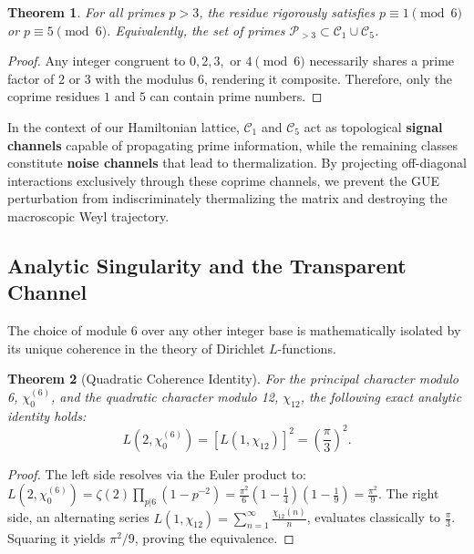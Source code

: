 \documentclass[prl,aps,floatfix,superscriptaddress,10pt]{revtex4-2}
\newtheorem{theorem}{Theorem}[section]
\begin{document}
\begin{theorem}
For all primes $p > 3$, the residue rigorously satisfies $p \equiv 1 \pmod 6$ or $p \equiv 5 \pmod 6$. Equivalently, the set of primes $\mathcal{P}_{>3} \subset \mathcal{C}_1 \cup \mathcal{C}_5$.
\end{theorem}

\begin{proof}
Any integer congruent to $0, 2, 3,$ or $4 \pmod 6$ necessarily shares a prime factor of $2$ or $3$ with the modulus $6$, rendering it composite. Therefore, only the coprime residues $1$ and $5$ can contain prime numbers.
\end{proof}

In the context of our Hamiltonian lattice, $\mathcal{C}_1$ and $\mathcal{C}_5$ act as topological \textbf{signal channels} capable of propagating prime information, while the remaining classes constitute \textbf{noise channels} that lead to thermalization. By projecting off-diagonal interactions exclusively through these coprime channels, we prevent the GUE perturbation from indiscriminately thermalizing the matrix and destroying the macroscopic Weyl trajectory.

\subsection{Analytic Singularity and the Transparent Channel}

The choice of module 6 over any other integer base is mathematically isolated by its unique coherence in the theory of Dirichlet $L$-functions.

\begin{theorem}[Quadratic Coherence Identity]
\label{thm:quadratic}
For the principal character modulo 6, $\chi_0^{(6)}$, and the quadratic character modulo 12, $\chi_{12}$, the following exact analytic identity holds:
\begin{equation}
L(2, \chi_0^{(6)}) = \left[ L(1, \chi_{12}) \right]^2 = \left( \frac{\pi}{3} \right)^2.
\end{equation}
\end{theorem}

\begin{proof}
The left side resolves via the Euler product to:
$L(2, \chi_0^{(6)}) = \zeta(2) \prod_{p|6} (1-p^{-2}) = \frac{\pi^2}{6} \left(1-\frac{1}{4}\right)\left(1-\frac{1}{9}\right) = \frac{\pi^2}{9}$.
The right side, an alternating series $L(1, \chi_{12}) = \sum_{n=1}^\infty \frac{\chi_{12}(n)}{n}$, evaluates classically to $\frac{\pi}{3}$. Squaring it yields $\pi^2/9$, proving the equivalence.
\end{proof}
\end{document}
